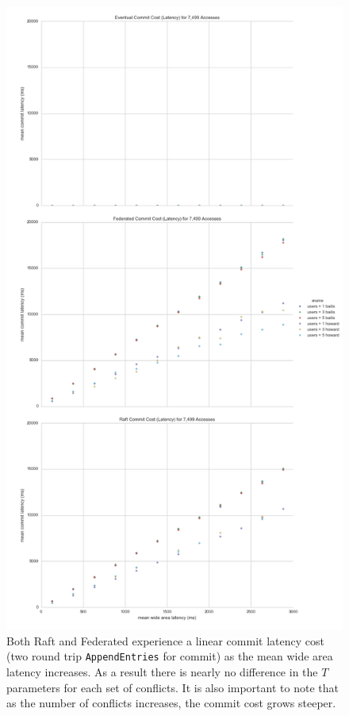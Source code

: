 \documentclass[10pt,letterpaper]{article}
\begin{document}
\begin{figure}[!h]
    \centering
        \includegraphics[height=0.9\textheight]{figures/commit_latency.png}
        \caption{\textsf{Both Raft and Federated experience a linear commit latency cost (two round trip \texttt{AppendEntries} for commit) as the mean wide area latency increases. As a result there is nearly no difference in the $T$ parameters for each set of conflicts. It is also important to note that as the number of conflicts increases, the commit cost grows steeper.}}
        \label{fig:commit_latency}
\end{figure}
\end{document}
